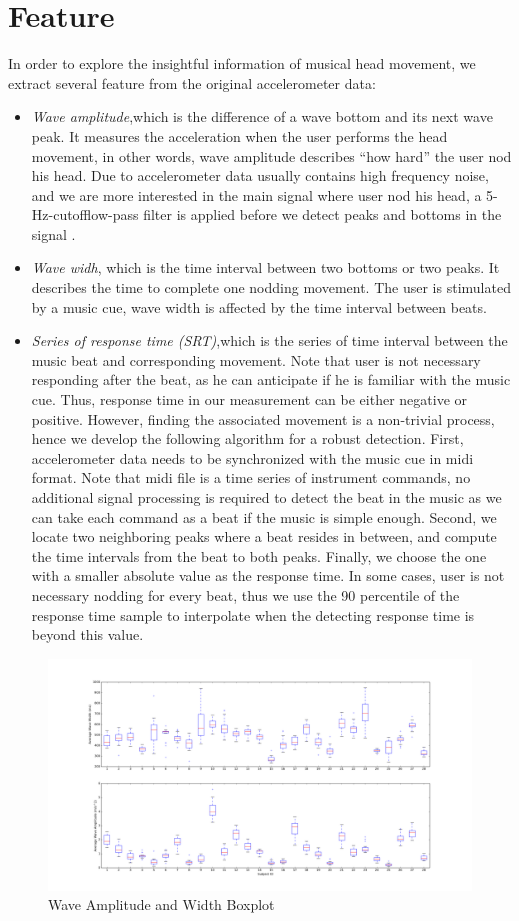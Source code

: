 \section{Feature}
In order to explore the insightful  information of musical head movement, we extract several feature from the original accelerometer data:
\begin{itemize}
\item{\em Wave amplitude},which is the difference of a wave bottom and its next wave peak. It measures the acceleration when the user performs the head movement, in other words, wave amplitude describes “how hard” the user nod his head. Due to accelerometer data usually contains high frequency noise, and we are more interested in the main signal where user nod his head, a 5-Hz-cutofflow-pass filter is applied before we detect peaks and bottoms in the signal .   
\item{\em Wave widh}, which is the time interval between two bottoms or two peaks. It describes the time to complete one nodding movement. The user is stimulated by a music cue, wave width is affected by the time interval between beats.
\item{\em Series of response time (SRT)},which is the series of time interval between the music beat and corresponding movement. Note that user is not necessary responding after the beat, as he can anticipate if he is familiar with the music cue. Thus, response time in our measurement can be either negative or positive. However, finding the associated movement is a non-trivial process, hence we develop the following algorithm for a robust detection. First, accelerometer data needs to be synchronized with the music cue in midi format. Note that midi file is a time series of instrument commands,  no additional signal processing is required to detect the beat in the music as we can take each command as a beat if the music is simple enough. Second, we locate two neighboring peaks where a beat resides in between, and compute the time intervals from the beat to both peaks. Finally, we choose the one with a smaller absolute value as the response time. In some cases,  user is not necessary nodding for every beat,  thus we use the 90 percentile of the response time sample to interpolate  when the detecting response time is beyond this value. 
\end{itemize}
\begin{figure}
\includegraphics[width=\columnwidth]{figure/width_amp_box.png}
\caption{\label{fig:width_amp} Wave Amplitude and Width Boxplot}
\end{figure}

